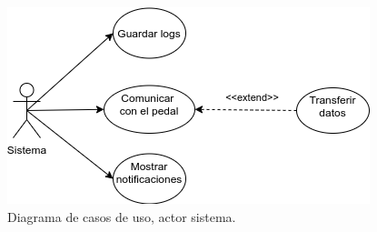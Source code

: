 \begin{figure}[!ht]
    \centering
    \includegraphics[scale=0.44]{images/diagram-usecase-system.png}
    \caption{Diagrama de casos de uso, actor sistema.}
    \label{fig: use-cases-system}
\end{figure}

